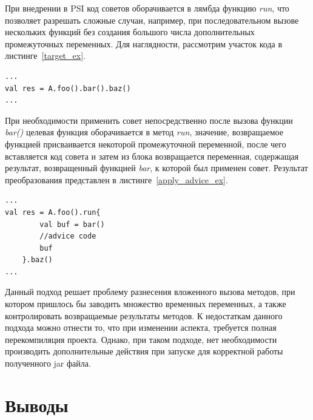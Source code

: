 При внедрении в PSI код советов оборачивается в лямбда функцию \textit{run}, что
позволяет разрешать сложные случаи, например, при последовательном вызове
нескольких функций без создания большого числа дополнительных 
промежуточных переменных.
Для наглядности, рассмотрим участок кода в листинге~\ref{target_ex}.
\begin{lstlisting}[label=target_ex,
    caption={Пример целевой точки внедрения}]
...
val res = A.foo().bar().baz()
...
\end{lstlisting}
При необходимости применить совет непосредственно после вызова функции 
\textit{bar()} целевая функция оборачивается в метод \textit{run}, значение, 
возвращаемое функцией присваивается некоторой промежуточной переменной, после 
чего вставляется код совета и затем из блока возвращается переменная, 
содержащая результат, возвращенный функцией \textit{bar}, к которой был применен
совет.
Результат преобразования представлен в листинге~\ref{apply_advice_ex}.
\begin{lstlisting}[label=apply_advice_ex,
    caption={Пример внедрения кода с использованием функции run}]
...
val res = A.foo().run{
        val buf = bar()
        //advice code
        buf
    }.baz()
...
\end{lstlisting}

Данный подход решает проблему разнесения вложенного вызова методов, при котором 
пришлось бы заводить множество временных переменных, а также контролировать 
возвращаемые результаты методов.
К недостаткам данного подхода можно отнести то, что при изменении аспекта,
требуется полная перекомпиляция проекта.
Однако, при таком подходе, нет необходимости производить дополнительные действия
при запуске для корректной работы полученного jar файла.
\section{Выводы}
\label{sec:design_conclusion}
